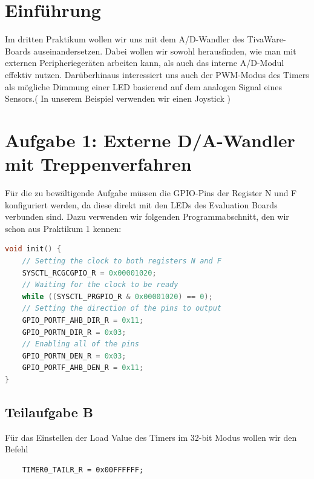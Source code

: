 \documentclass{article}
\begin{document}
\newpage


\tableofcontents

\listoffigures

\lstlistoflistings

\newpage

\section{Einführung}

Im dritten Praktikum wollen wir uns mit dem A/D-Wandler des TivaWare-Boards auseinandersetzen. Dabei wollen wir sowohl herausfinden, wie man mit externen Peripheriegeräten arbeiten kann, als auch das interne A/D-Modul effektiv nutzen. Darüberhinaus interessiert uns auch der PWM-Modus des Timers als mögliche Dimmung einer LED basierend auf dem analogen Signal eines Sensors.(
In unserem Beispiel verwenden wir einen Joystick
)

\section{Aufgabe 1: Externe D/A-Wandler mit Treppenverfahren}

Für die zu bewältigende Aufgabe müssen die GPIO-Pins der Register N und F konfiguriert werden, da diese direkt mit den LEDs des Evaluation Boards verbunden sind.
Dazu verwenden wir folgenden Programmabschnitt, den wir schon aus Praktikum 1 kennen:

\begin{lstlisting}[language=c, caption={GPIO-Port Konfiguration}, captionpos=b]
void init() {
    // Setting the clock to both registers N and F
    SYSCTL_RCGCGPIO_R = 0x00001020;
    // Waiting for the clock to be ready
    while ((SYSCTL_PRGPIO_R & 0x00001020) == 0);
    // Setting the direction of the pins to output
    GPIO_PORTF_AHB_DIR_R = 0x11;
    GPIO_PORTN_DIR_R = 0x03;
    // Enabling all of the pins
    GPIO_PORTN_DEN_R = 0x03;
    GPIO_PORTF_AHB_DEN_R = 0x11;
}
\end{lstlisting}

\subsection{Teilaufgabe B}
\label{eq:eins}
Für das Einstellen der Load Value des Timers im 32-bit Modus wollen wir den Befehl
\begin{verbatim}
    TIMER0_TAILR_R = 0x00FFFFFF;
\end{verbatim}
\end{document}
